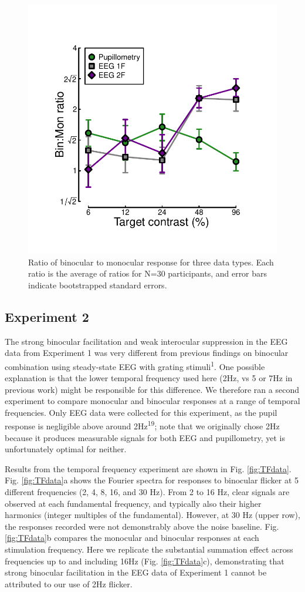 \documentclass[
]{article}
\begin{document}
\begin{figure}

{\centering \includegraphics[width=0.5\linewidth]{Figures/BSratios} 

}

\caption{Ratio of binocular to monocular response for three data types. Each ratio is the average of ratios for N=30 participants, and error bars indicate bootstrapped standard errors.}\label{fig:BSratios}
\end{figure}

\hypertarget{experiment-2}{%
\subsection{Experiment 2}\label{experiment-2}}

The strong binocular facilitation and weak interocular suppression in the EEG data from Experiment 1 was very different from previous findings on binocular combination using steady-state EEG with grating stimuli\textsuperscript{1}. One possible explanation is that the lower temporal frequency used here (2Hz, vs 5 or 7Hz in previous work) might be responsible for this difference. We therefore ran a second experiment to compare monocular and binocular responses at a range of temporal frequencies. Only EEG data were collected for this experiment, as the pupil response is negligible above around 2Hz\textsuperscript{19}; note that we originally chose 2Hz because it produces measurable signals for both EEG and pupillometry, yet is unfortunately optimal for neither.

Results from the temporal frequency experiment are shown in Fig. \ref{fig:TFdata}. Fig. \ref{fig:TFdata}a shows the Fourier spectra for responses to binocular flicker at 5 different frequencies (2, 4, 8, 16, and 30 Hz). From 2 to 16 Hz, clear signals are observed at each fundamental frequency, and typically also their higher harmonics (integer multiples of the fundamental). However, at 30 Hz (upper row), the responses recorded were not demonstrably above the noise baseline. Fig. \ref{fig:TFdata}b compares the monocular and binocular responses at each stimulation frequency. Here we replicate the substantial summation effect across frequencies up to and including 16Hz (Fig. \ref{fig:TFdata}c), demonstrating that strong binocular facilitation in the EEG data of Experiment 1 cannot be attributed to our use of 2Hz flicker.
\end{document}
